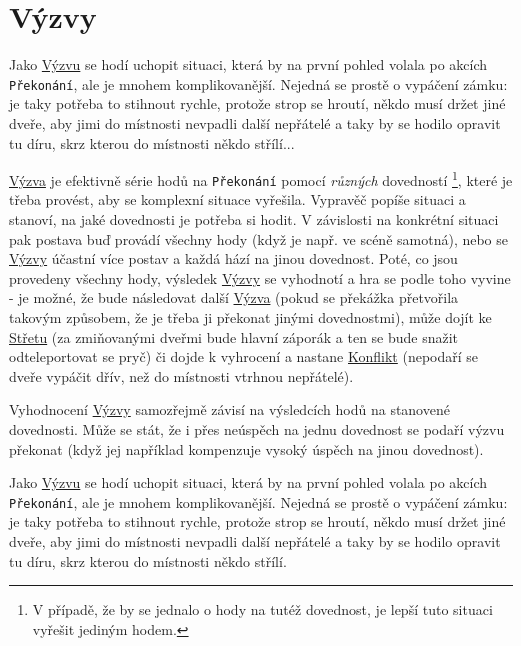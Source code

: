 \section{Výzvy}
\label{sec:vyzvy}

Jako \underline{Výzvu} se hodí uchopit situaci, která by na první pohled volala po akcích \texttt{Překonání}, ale je mnohem komplikovanější. Nejedná se prostě o vypáčení zámku: je taky potřeba to stihnout rychle, protože strop se hroutí, někdo musí držet jiné dveře, aby jimi do místnosti nevpadli další nepřátelé a taky by se hodilo opravit tu díru, skrz kterou do místnosti někdo střílí...

\underline{Výzva} je efektivně série hodů na \texttt{Překonání} pomocí \textit{různých} dovedností \footnote{V případě, že by se jednalo o hody na tutéž dovednost, je lepší tuto situaci vyřešit jediným hodem.}, které je třeba provést, aby se komplexní situace vyřešila. Vypravěč popíše situaci a stanoví, na jaké dovednosti je potřeba si hodit. V závislosti na konkrétní situaci pak postava buď provádí všechny hody (když je např. ve scéně samotná), nebo se \underline{Výzvy} účastní více postav a každá hází na jinou dovednost. Poté, co jsou provedeny všechny hody, výsledek \underline{Výzvy} se vyhodnotí a hra se podle toho vyvine - je možné, že bude následovat další \underline{Výzva} (pokud se překážka přetvořila takovým způsobem, že je třeba ji překonat jinými dovednostmi), může dojít ke \underline{Střetu} (za zmiňovanými dveřmi bude hlavní záporák a ten se bude snažit odteleportovat se pryč) či dojde k vyhrocení a nastane \underline{Konflikt} (nepodaří se dveře vypáčit dřív, než do místnosti vtrhnou nepřátelé).

Vyhodnocení \underline{Výzvy} samozřejmě závisí na výsledcích hodů na stanovené dovednosti. Může se stát, že i přes neúspěch na jednu dovednost se podaří výzvu překonat (když jej například kompenzuje vysoký úspěch na jinou dovednost).

Jako \underline{Výzvu} se hodí uchopit situaci, která by na první pohled volala po akcích \texttt{Překonání}, ale je mnohem komplikovanější. Nejedná se prostě o vypáčení zámku: je taky potřeba to stihnout rychle, protože strop se hroutí, někdo musí držet jiné dveře, aby jimi do místnosti nevpadli další nepřátelé a taky by se hodilo opravit tu díru, skrz kterou do místnosti někdo střílí.

